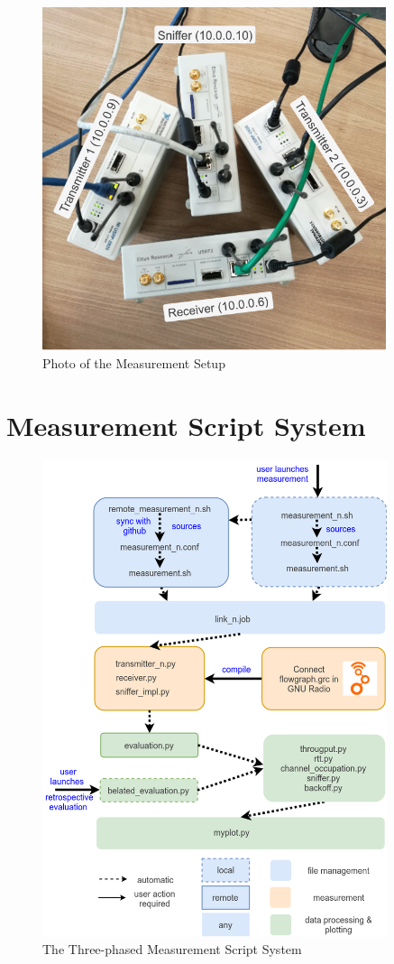 \begin{figure}[ht]
	\label{fig:measurement-setup}
	\begin{center}
		\includegraphics[width=0.9\textwidth]{pictures/measurement_setup}
	\end{center}
	\caption{Photo of the Measurement Setup}
\end{figure}

\section{Measurement Script System}
\label{sec:script-system}

\begin{figure}[ht]
	\label{fig:script-system}
	\begin{center}
		\includegraphics[width=0.9\textwidth]{pictures/script_system}
	\end{center}
	\caption{The Three-phased Measurement Script System}
\end{figure}